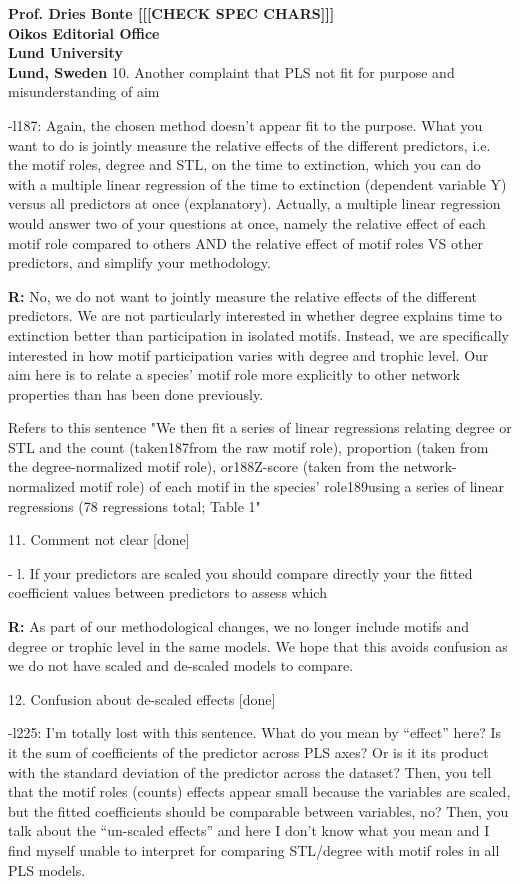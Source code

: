 \documentclass[12pt]{letter}
\begin{document}
\begin{letter}{\bf Prof. Dries Bonte [[[CHECK SPEC CHARS]]]\\
Oikos Editorial Office \\
Lund University \\
Lund, Sweden}
    10. Another complaint that PLS not fit for purpose and misunderstanding of aim

      -l187: Again, the chosen method doesn’t appear fit to the purpose. What you want to do is jointly measure the relative effects of the different predictors, i.e. the motif roles, degree and STL, on the time to extinction, which you can do with a multiple linear regression of the time to extinction (dependent variable Y) versus all predictors at once (explanatory). Actually, a multiple linear regression would answer two of your questions at once, namely the relative effect of each motif role compared to others AND the relative effect of motif roles VS other predictors, and simplify your methodology.
      
      \textbf{R:} No, we do not want to jointly measure the relative effects of the different predictors. We are not particularly interested in whether degree explains time to extinction better than participation in isolated motifs. Instead, we are specifically interested in how motif participation varies with degree and trophic level. Our aim here is to relate a species' motif role more explicitly to other network properties than has been done previously.

      Refers to this sentence "We then fit a series of linear regressions relating degree or STL and the count (taken187from the raw motif role), proportion (taken from the degree-normalized motif role), or188Z-score (taken from the network-normalized motif role) of each motif in the species’ role189using a series of linear regressions (78 regressions total; Table 1"


    11. Comment not clear [done]

      - l. If your predictors are scaled you should compare directly your the fitted coefficient values between predictors to assess which

      \textbf{R:} As part of our methodological changes, we no longer include motifs and degree or trophic level in the same models. We hope that this avoids confusion as we do not have scaled and de-scaled models to compare.


    12. Confusion about de-scaled effects [done]

      -l225: I’m totally lost with this sentence. What do you mean by “effect” here? Is it the sum of coefficients of the predictor across PLS axes? Or is it its product with the standard deviation of the predictor across the dataset? Then, you tell that the motif roles (counts) effects appear small because the variables are scaled, but the fitted coefficients should be comparable between variables, no?  Then, you talk about the “un-scaled effects” and here I don’t know what you mean and I find myself unable to interpret for comparing STL/degree with motif roles in all PLS models.


\end{letter}
\end{document}
